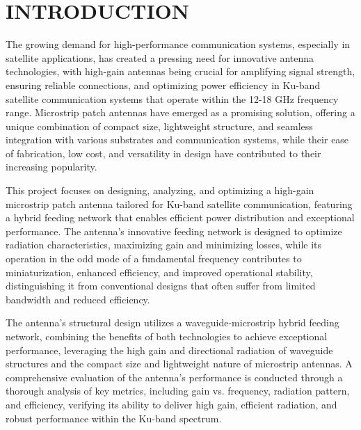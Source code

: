 \documentclass[12pt]{article}
\begin{document}
%
%

\newpage
\tableofcontents
{}

\newpage
\listoffigures

\newpage
\listoftables


\newpage
\noborders
{}

\section{INTRODUCTION}

\par The growing demand for high-performance communication systems, especially in satellite applications, has created a pressing need for innovative antenna technologies, with high-gain antennas being crucial for amplifying signal strength, ensuring reliable connections, and optimizing power efficiency in Ku-band satellite communication systems that operate within the 12-18 GHz frequency range. Microstrip patch antennas have emerged as a promising solution, offering a unique combination of compact size, lightweight structure, and seamless integration with various substrates and communication systems, while their ease of fabrication, low cost, and versatility in design have contributed to their increasing popularity.\\

\par This project focuses on designing, analyzing, and optimizing a high-gain microstrip patch antenna tailored for Ku-band satellite communication, featuring a hybrid feeding network that enables efficient power distribution and exceptional performance. The antenna's innovative feeding network is designed to optimize radiation characteristics, maximizing gain and minimizing losses, while its operation in the odd mode of a fundamental frequency contributes to miniaturization, enhanced efficiency, and improved operational stability, distinguishing it from conventional designs that often suffer from limited bandwidth and reduced efficiency.\\

\par The antenna's structural design utilizes a waveguide-microstrip hybrid feeding network, combining the benefits of both technologies to achieve exceptional performance, leveraging the high gain and directional radiation of waveguide structures and the compact size and lightweight nature of microstrip antennas. A comprehensive evaluation of the antenna's performance is conducted through a thorough analysis of key metrics, including gain vs. frequency, radiation pattern, and efficiency, verifying its ability to deliver high gain, efficient radiation, and robust performance within the Ku-band spectrum.\\
\end{document}

